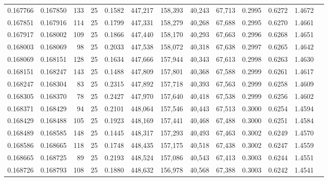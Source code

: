 \begin{tabular}{rrrrrrrrrrrrr}
0.167766 & 0.167850 &   133 &  25 &                                     0.1582 & 447,217 & 158,393 &  40,243 &  67,713 & 0.2995 & 0.6272 & 1.4672 \\
0.167851 & 0.167916 &   114 &  25 &                                     0.1799 & 447,331 & 158,279 &  40,268 &  67,688 & 0.2995 & 0.6270 & 1.4661 \\
0.167917 & 0.168002 &   109 &  25 &                                     0.1866 & 447,440 & 158,170 &  40,293 &  67,663 & 0.2996 & 0.6268 & 1.4651 \\
0.168003 & 0.168069 &    98 &  25 &                                     0.2033 & 447,538 & 158,072 &  40,318 &  67,638 & 0.2997 & 0.6265 & 1.4642 \\
0.168069 & 0.168151 &   128 &  25 &                                     0.1634 & 447,666 & 157,944 &  40,343 &  67,613 & 0.2998 & 0.6263 & 1.4630 \\
0.168151 & 0.168247 &   143 &  25 &                                     0.1488 & 447,809 & 157,801 &  40,368 &  67,588 & 0.2999 & 0.6261 & 1.4617 \\
0.168247 & 0.168304 &    83 &  25 &                                     0.2315 & 447,892 & 157,718 &  40,393 &  67,563 & 0.2999 & 0.6258 & 1.4609 \\
0.168305 & 0.168370 &    78 &  25 &                                     0.2427 & 447,970 & 157,640 &  40,418 &  67,538 & 0.2999 & 0.6256 & 1.4602 \\
0.168371 & 0.168429 &    94 &  25 &                                     0.2101 & 448,064 & 157,546 &  40,443 &  67,513 & 0.3000 & 0.6254 & 1.4594 \\
0.168429 & 0.168488 &   105 &  25 &                                     0.1923 & 448,169 & 157,441 &  40,468 &  67,488 & 0.3000 & 0.6251 & 1.4584 \\
0.168489 & 0.168585 &   148 &  25 &                                     0.1445 & 448,317 & 157,293 &  40,493 &  67,463 & 0.3002 & 0.6249 & 1.4570 \\
0.168586 & 0.168665 &   118 &  25 &                                     0.1748 & 448,435 & 157,175 &  40,518 &  67,438 & 0.3002 & 0.6247 & 1.4559 \\
0.168665 & 0.168725 &    89 &  25 &                                     0.2193 & 448,524 & 157,086 &  40,543 &  67,413 & 0.3003 & 0.6244 & 1.4551 \\
0.168726 & 0.168793 &   108 &  25 &                                     0.1880 & 448,632 & 156,978 &  40,568 &  67,388 & 0.3003 & 0.6242 & 1.4541 \\

\end{tabular}
